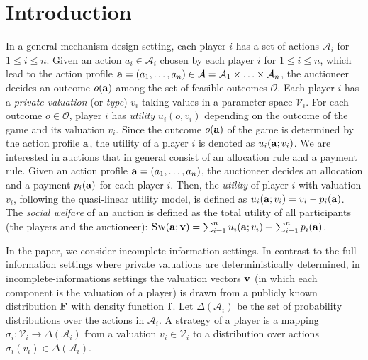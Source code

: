 \section{Introduction}	\label{sec:welfare}
%
In a general mechanism design setting, each player $i$ has a set of actions $\mathcal{A}_{i}$
for $1 \leq i \leq n$. Given an action $a_{i} \in \mathcal{A}_{i}$ chosen by each player $i$ for $1 \leq i \leq n$, which lead to the
action profile $\mathbf{a} = (a_{1}, \ldots, a_{n}) \in \mathcal{A} = \mathcal{A}_{1} \times \ldots \times \mathcal{A}_{n}$,
the auctioneer decides an outcome $o(\mathbf{a})$ among the set of feasible outcomes $\mathcal{O}$.
Each player $i$ has a \emph{private valuation} (or \emph{type}) $v_{i}$ taking values in a parameter space $\mathcal{V}_{i}$.
For each outcome $o \in \mathcal{O}$, player $i$ has \emph{utility} $u_{i}(o,v_{i})$ depending on
the outcome of the game and its valuation $v_{i}$.
Since the outcome $o(\mathbf{a})$ of the game is determined by the action profile $\mathbf{a}$,
the utility of a player $i$ is denoted as $u_{i}(\mathbf{a};v_{i})$.
We are interested in auctions that in general consist of an allocation rule and a payment rule.
Given an action profile $\mathbf{a} = (a_{1}, \ldots, a_{n})$, the auctioneer decides an allocation
and a payment $p_{i}(\mathbf{a})$ for each player $i$.
Then, the \emph{utility} of player $i$ with valuation $v_{i}$, following the quasi-linear utility model,
is defined as $u_{i}(\mathbf{a};v_{i}) = v_{i} - p_{i}(\mathbf{a})$.
The \emph{social welfare} of an auction is defined as the total utility of all participants (the players and the auctioneer):
$\textsc{Sw}(\mathbf{a};\mathbf{v}) =  \sum_{i=1}^{n} u_{i}(\mathbf{a};v_{i}) + \sum_{i=1}^{n} p_{i}(\mathbf{a})$.

In the paper, we consider incomplete-information settings.
In contrast to the full-information settings where private valuations are deterministically determined, in
incomplete-informations settings the valuation vectors $\mathbf{v}$ (in which each component is the valuation of a player)
is drawn from a publicly known distribution $\mathbf{F}$ with density function $\mathbf{f}$.
Let $\Delta(\mathcal{A}_{i})$ be the set of probability distributions over the actions
in $\mathcal{A}_{i}$.  A strategy of a player is a mapping $\sigma_{i}: \mathcal{V}_{i} \rightarrow \Delta(\mathcal{A}_{i})$
from a valuation $v_{i} \in \mathcal{V}_{i}$ to a distribution over actions $\sigma_{i}(v_{i}) \in \Delta(\mathcal{A}_{i})$.

